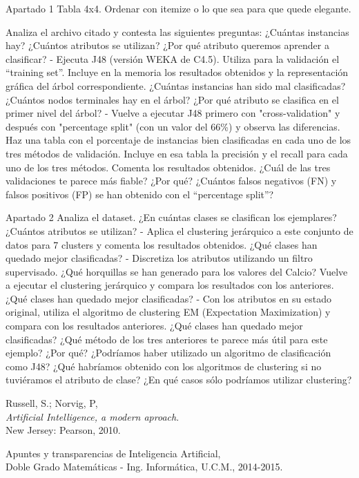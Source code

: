 \documentclass[11pt, a4paper, spanish, openright, twoside]{book}
\begin{document}
\begin{section}{Apartado 1}
	Tabla 4x4. Ordenar con itemize o lo que sea para que quede elegante. 
	
	 Analiza el archivo citado y contesta las siguientes preguntas: ¿Cuántas instancias hay? ¿Cuántos 
atributos se utilizan? ¿Por qué atributo queremos aprender a clasificar? 
- Ejecuta J48 (versión WEKA de C4.5). Utiliza para la validación el “training set”. Incluye en la 
memoria los resultados obtenidos y la representación gráfica del árbol correspondiente. ¿Cuántas 
instancias han sido mal clasificadas? ¿Cuántos nodos terminales hay en el árbol? ¿Por qué atributo 
se clasifica en el primer nivel del árbol? 
- Vuelve a ejecutar J48 primero con "cross-validation" y después con "percentage split" (con un valor 
del 66\%) y observa las diferencias. Haz una tabla con el porcentaje de instancias bien clasificadas en 
cada uno de los tres métodos de validación. Incluye en esa tabla la precisión y el recall para cada 
uno de los tres métodos. Comenta los resultados obtenidos. ¿Cuál de las tres validaciones te parece 
más fiable? ¿Por qué? ¿Cuántos falsos negativos (FN) y falsos positivos (FP) se han obtenido con el 
“percentage split”? 

\end{section}

\begin{section}{Apartado 2}
	Analiza el dataset. ¿En cuántas clases se clasifican los ejemplares? ¿Cuántos atributos se utilizan? 
- Aplica el clustering jerárquico a este conjunto de datos para 7 clusters y comenta los resultados 
obtenidos. ¿Qué clases han quedado mejor clasificadas? 
- Discretiza los atributos utilizando un filtro supervisado. ¿Qué horquillas se han generado para los 
valores del Calcio? Vuelve a ejecutar el clustering jerárquico y compara los resultados con los 
anteriores. ¿Qué clases han quedado mejor clasificadas? 
- Con los atributos en su estado original, utiliza el algoritmo de clustering EM (Expectation 
Maximization) y compara con los resultados anteriores. ¿Qué clases han quedado mejor 
clasificadas? ¿Qué método de los tres anteriores te parece más útil para este ejemplo? ¿Por qué? 
¿Podríamos haber utilizado un algoritmo de clasificación como J48? ¿Qué habríamos obtenido con 
los algoritmos de clustering si no tuviéramos el atributo de clase? ¿En qué casos sólo podríamos 
utilizar clustering?
\end{section}

	
\begin{thebibliography}{9}

	Russell, S.; Norvig, P, \\
	\emph{Artificial Intelligence, a modern aproach}.\\
	New Jersey: Pearson, 2010.
	
	Apuntes y transparencias de Inteligencia Artificial, \\
	Doble Grado Matemáticas - Ing. Informática, U.C.M., 2014-2015.

\end{thebibliography}
\end{document}
